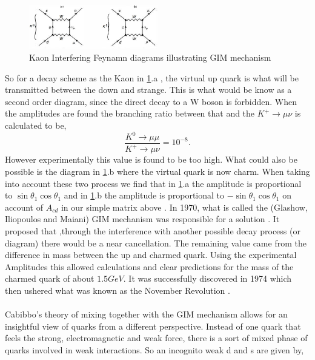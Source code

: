 \begin{figure}[h]
\centering
\includegraphics[width=0.5\textwidth]{figs/ckmfig3.jpg}
\caption{Kaon Interfering Feynamn diagrams illustrating GIM mechanism}
\label{fey2}
\end{figure}


So for a decay scheme as the Kaon in \cref{fey2}.a , the virtual up quark is what will be transmitted between the down and strange. This is what would be know as a second order diagram, since the direct decay to a W boson is forbidden. When the amplitudes are found the branching ratio between that and the $K^+\rightarrow\mu\nu$ is calculated to be,
\begin{equation}\label{mat3}
 \frac{K^0\rightarrow\mu\mu}{K^+\rightarrow\mu\nu}=10^{-8}.
\end{equation}
However experimentally this value is found to be too high. What could also be possible is the diagram in \cref{fey2}.b where the virtual quark is now charm. When taking into account these two process we find that in \cref{fey2}.a the amplitude is proportional to $\sin\theta_1 \cos\theta_1$ and in \cref{fey2}.b the amplitude is proportional to $-\sin\theta_1 \cos\theta_1$ on account of $A_{cd}$ in our simple matrix above \cite{CKM5}. 
In 1970, what is called the (Glashow, Iliopoulos and Maiani) GIM mechanism was responsible for a solution \cite{CKM9}. It proposed that ,through the interference with another possible decay process (or diagram) there would be a near cancellation. The remaining value came from the difference in mass between the up and charmed quark. Using the experimental Amplitudes this allowed calculations and clear predictions for the mass of the charmed quark of about $1.5GeV$. It was successfully discovered in 1974 which then ushered what was known as the November Revolution \cite{CKM2}.
 \\
\\
Cabibbo's theory of mixing together with the GIM mechanism allows for an insightful view of quarks from a different perspective. Instead of one quark that feels the strong, electromagnetic and weak force, there is a sort of mixed phase of quarks involved in weak interactions. So an incognito weak d and s are given by,

